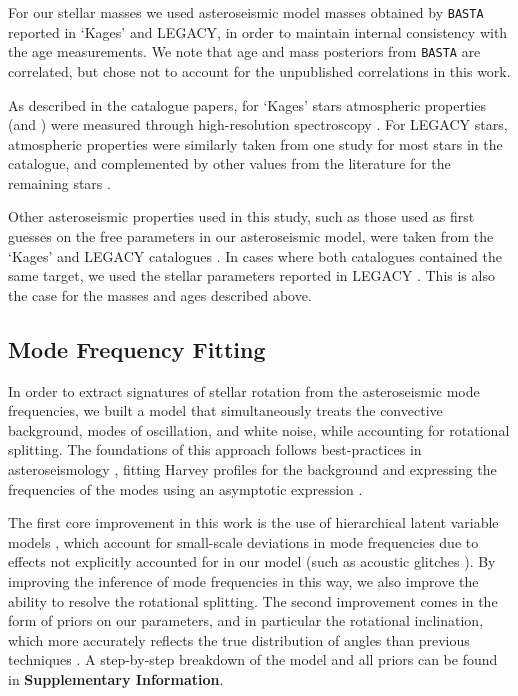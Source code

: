 For our stellar masses we used asteroseismic model masses obtained by \texttt{BASTA} reported in `Kages' and LEGACY, in order to maintain internal consistency with the age measurements. We note that age and mass posteriors from \texttt{BASTA} are correlated, but chose not to account for the unpublished correlations in this work.

As described in the catalogue papers, for `Kages' stars atmospheric properties (\teff and \feh) were measured through high-resolution spectroscopy \cite{m_huber+2013a}. For LEGACY stars, atmospheric properties were similarly taken from one study \cite{m_buchhave+latham2015} for most stars in the catalogue, and complemented by other values from the literature for the remaining stars \cite[see Table 3]{m_silvaaguirre+2017}.

Other asteroseismic properties used in this study, such as those used as first guesses on the free parameters in our asteroseismic model, were taken from the `Kages' and LEGACY catalogues \cite{m_astropycollaboration+2013, m_astropycollaboration+2018, m_ginsburg+2019}. In cases where both catalogues contained the same target, we used the stellar parameters reported in LEGACY \cite{m_mckinney2010}. This is also the case for the masses and ages described above.

\subsection{Mode Frequency Fitting}

In order to extract signatures of stellar rotation from the asteroseismic mode frequencies, we built a model that simultaneously treats the convective background, modes of oscillation, and white noise, while accounting for rotational splitting. The foundations of this approach follows best-practices in asteroseismology \cite{m_davies+2015}, fitting Harvey profiles for the background \cite{m_harvey1985} and expressing the frequencies of the modes using an asymptotic expression \cite{m_tassoul1980, m_vrard+2016}.

The first core improvement in this work is the use of hierarchical latent variable models \cite{m_hogg+2010, m_hall+2019}, which account for small-scale deviations in mode frequencies due to effects not explicitly accounted for in our model (such as acoustic glitches \cite{m_mazumdar+2014}). By improving the inference of mode frequencies in this way, we also improve the ability to resolve the rotational splitting. The second improvement comes in the form of priors on our parameters, and in particular the rotational inclination, which more accurately reflects the true distribution of angles than previous techniques \cite{m_chaplin+basu2017}. A step-by-step breakdown of the model and all priors can be found in \textbf{Supplementary Information}.\\


